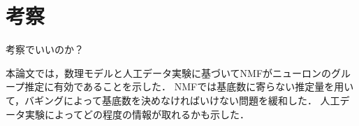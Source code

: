 \chapter{考察}
考察でいいのか？

本論文では，数理モデルと人工データ実験に基づいてNMFがニューロンのグループ推定に有効であることを示した．
NMFでは基底数に寄らない推定量を用いて，バギングによって基底数を決めなければいけない問題を緩和した．
人工データ実験によってどの程度の情報が取れるかも示した．
